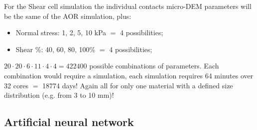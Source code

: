 For the Shear cell simulation the individual contacts micro-DEM parameters will be the same of the AOR simulation, plus:
\begin{itemize}
\item{Normal stress: 1, 2, 5, 10 kPa $=$ 4 possibilities;}
\item{Shear \%: 40, 60, 80, 100\% $=$ 4 possibilities;}
\end{itemize}
$20 \cdot 20 \cdot 6 \cdot 11 \cdot 4 \cdot 4 = 422400$ possible combinations of parameters.
Each combination would require a simulation, each simulation requires 64 minutes over 32 cores $=$ 18774 days!
Again all for only one material with a defined size distribution (e.g. from 3 to 10 mm)!


\subsection{Artificial neural network}
\label{subsection:artificialneuralnetwork}

